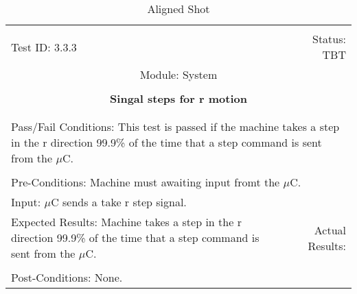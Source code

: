\documentclass[titlepage]{article}
\begin{document}
\begin{center}%
\begin{table}
\begin{tabular}{|l r|}\hline&\\[-2mm]
	Test ID: 3.3.3	&Status: TBT\\[-3mm]
	\multicolumn{2}{|c|}{Module: System}\\&\\
	\multicolumn{2}{|c|}{\textbf{\large{Singal steps for r motion}}}\\&\\\hline&\\[-3mm]
	\multicolumn{2}{|p{\textwidth}|}{Pass/Fail Conditions: This test is passed if the machine takes a step in the r direction 99.9\% of the time that a step command is sent from the $\mu$C.}\\[1mm]\hline&\\[-3mm]
	\multicolumn{2}{|p{\textwidth}|}{Pre-Conditions: Machine must awaiting input fromt the $\mu$C.}\\[4mm]
	\multicolumn{2}{|p{\textwidth}|}{Input: $\mu$C sends a take r step signal.}\\[2mm]\hline
	\multicolumn{1}{|p{0.49\textwidth}}{Expected Results: Machine takes a step in the r direction 99.9\% of the time that a step command is sent from the $\mu$C.}	&\multicolumn{1}{|p{0.45\textwidth}|}{Actual Results: }\\\hline&\\[-3mm]
	\multicolumn{2}{|p{\textwidth}|}{Post-Conditions: None.}\\\hline
\end{tabular}
\caption{Aligned Shot}
\end{table}
\end{center}
\end{document}
